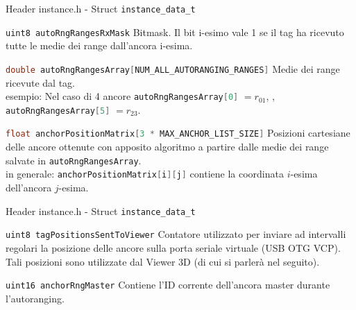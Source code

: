 \begin{frame}{Header instance.h - Struct \lstinline[language=C]!instance_data_t!}
  \begin{block}{\lstinline[language=C]!uint8 autoRngRangesRxMask!}
    Bitmask. Il bit i-esimo vale 1 se il tag ha ricevuto \alert{tutte} le medie dei range dall'ancora i-esima.
  \end{block}
  \begin{block}{\lstinline[language=C]!double autoRngRangesArray[NUM_ALL_AUTORANGING_RANGES]!}
    Medie dei range ricevute dal tag.\\
    \textcolor{dgreen}{esempio:} Nel caso di 4 ancore \lstinline[language=C]!autoRngRangesArray[0]! $ = r_{01}$,
    \hdots, \lstinline[language=C]!autoRngRangesArray[5]! $ = r_{23}$.
  \end{block}
  \begin{block}{\lstinline[language=C]!float anchorPositionMatrix[3 * MAX_ANCHOR_LIST_SIZE]!}
    Posizioni cartesiane delle ancore ottenute con apposito algoritmo a partire dalle medie dei range salvate
    in \lstinline[language=C]!autoRngRangesArray!.\\
    \alert{in generale:} \lstinline[language=C]!anchorPositionMatrix[i][j]! contiene la coordinata $i$-esima dell'ancora $j$-esima.
  \end{block}
\end{frame}

\begin{frame}{Header instance.h - Struct \lstinline[language=C]!instance_data_t!}
  \begin{block}{\lstinline[language=C]!uint8 tagPositionsSentToViewer!}
    Contatore utilizzato per inviare ad intervalli regolari la posizione delle ancore sulla porta seriale
    virtuale (USB OTG VCP). Tali posizioni sono utilizzate dal Viewer 3D (di cui si parlerà nel seguito).
  \end{block}
  \begin{block}{\lstinline[language=C]!uint16 anchorRngMaster!}
    Contiene l'ID corrente dell'ancora master durante l'autoranging.
  \end{block}
\end{frame}

